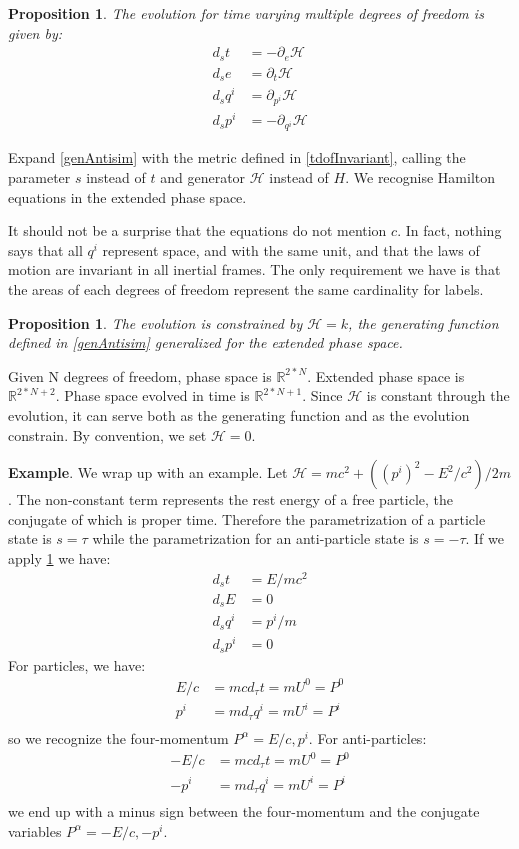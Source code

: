 \documentclass[twocolumn,floatfix,nofootinbib]{revtex4}   %
\theoremstyle{theorem}
\newtheorem{prop}[thm]{Proposition}
\theoremstyle{definition}
\begin{document}
\begin{prop}\label{tdofHam}
The evolution for time varying multiple degrees of freedom is given by:
\begin{align*}
d_{s}t &= - \partial_{e} \mathcal{H} \\
d_{s}e &= \partial_{t} \mathcal{H} \\
d_{s}q^i &= \partial_{p^i} \mathcal{H} \\
d_{s}p^i &= - \partial_{q^i} \mathcal{H}
\end{align*}
\end{prop}

Expand \ref{genAntisim} with the metric defined in \ref{tdofInvariant}, calling the parameter $s$ instead of $t$ and generator $\mathcal{H}$ instead of $H$. We recognise Hamilton equations in the extended phase space.

It should not be a surprise that the equations do not mention $c$. In fact, nothing says that all $q^i$ represent space, and with the same unit, and that the laws of motion are invariant in all inertial frames. The only requirement we have is that the areas of each degrees of freedom represent the same cardinality for labels.

\begin{prop}\label{tdofConstrain}
The evolution is constrained by $\mathcal{H}=k$, the generating function defined in \ref{genAntisim} generalized for the extended phase space.
\end{prop}

Given N degrees of freedom, phase space is $\mathbb{R}^{2*N}$. Extended phase space is $\mathbb{R}^{2*N + 2}$. Phase space evolved in time is $\mathbb{R}^{2*N + 1}$. Since $\mathcal{H}$ is constant through the evolution, it can serve both as the generating function and as the evolution constrain. By convention, we set $\mathcal{H}=0$.

\textbf{Example}. We wrap up with an example. Let $\mathcal{H}= mc^2 + ((p^i)^2 - E^2/c^2) / 2m$. The non-constant term represents the rest energy of a free particle, the conjugate of which is proper time. Therefore the parametrization of a particle state is $s=\tau$ while the parametrization for an anti-particle state is $s=-\tau$. If we apply \ref{tdofHam} we have:
\begin{align*}
d_{s}t &= E / mc^2 \\
d_{s}E &= 0 \\
d_{s}q^i &= p^i / m \\
d_{s}p^i &= 0
\end{align*}
For particles, we have:
\begin{align*}
E / c &= m c d_{\tau}t = m U^0 = P^0 \\
p^i &= m d_{\tau}q^i = m U^i = P^i \\
\end{align*}
so we recognize the four-momentum $P^\alpha = {E/c, p^i}$. For anti-particles:
\begin{align*}
- E / c &= m c d_{\tau}t = m U^0 = P^0 \\
- p^i &= m d_{\tau}q^i = m U^i = P^i \\
\end{align*}
we end up with a minus sign between the four-momentum and the conjugate variables $P^\alpha = {-E/c, -p^i}$.
\end{document}
